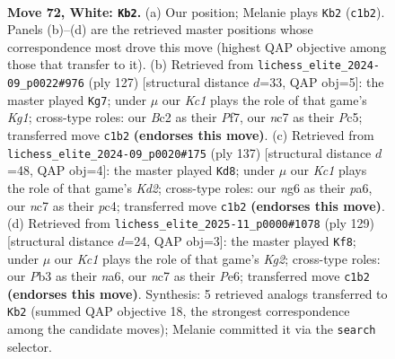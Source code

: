 \documentclass[11pt]{article}
\begin{document}
\clearpage

\begin{figure}[p]\centering
\begin{subfigure}{0.46\textwidth}\centering
\resizebox{\linewidth}{!}{%
\newchessgame
\chessboard[
  setfen={8/2n3k1/1b1N2n1/p7/P2pP3/1P5p/2B1P3/2K5 w - - 10 72},
  showmover=false,
  pgfstyle=straightmove, color=movearrow, markmove={c1-b2}
]}
\caption{}
\end{subfigure}\hfill
\begin{subfigure}{0.46\textwidth}\centering
\resizebox{\linewidth}{!}{%
\newchessgame
\chessboard[
  setfen={6k1/4bp2/3p4/2pP1Pp1/2P5/2NK4/1B6/8 b - - 2 64},
  showmover=false,
  pgfstyle=straightmove, color=movearrow, markmove={g8-g7}
]}
\caption{}
\end{subfigure}
\\[4pt]
\begin{subfigure}{0.46\textwidth}\centering
\resizebox{\linewidth}{!}{%
\newchessgame
\chessboard[
  setfen={8/3k4/PK4p1/7p/2PBb2P/5p2/5P2/8 b - - 8 69},
  showmover=false,
  pgfstyle=straightmove, color=movearrow, markmove={d7-d8}
]}
\caption{}
\end{subfigure}\hfill
\begin{subfigure}{0.46\textwidth}\centering
\resizebox{\linewidth}{!}{%
\newchessgame
\chessboard[
  setfen={8/6k1/N3p2p/bn1bN1p1/4p3/6PP/1B3P2/5K2 b - - 0 65},
  showmover=false,
  pgfstyle=straightmove, color=movearrow, markmove={g7-f8}
]}
\caption{}
\end{subfigure}
\caption{\textbf{Move 72, White: \texttt{Kb2}.} (a) Our position; Melanie plays \texttt{Kb2} (\texttt{c1b2}). Panels (b)--(d) are the retrieved master positions whose correspondence most drove this move (highest QAP objective among those that transfer to it). (b) Retrieved from \texttt{lichess\_elite\_2024-09\_p0022\#976} (ply 127) [structural distance $d$=33, QAP obj=5]: the master played \texttt{Kg7}; under $\mu$ our \emph{Kc1} plays the role of that game's \emph{Kg1}; cross-type roles: our \emph{B}c2 as their \emph{P}f7, our \emph{n}c7 as their \emph{P}c5; transferred move \texttt{c1b2} \textbf{(endorses this move)}. (c) Retrieved from \texttt{lichess\_elite\_2024-09\_p0020\#175} (ply 137) [structural distance $d$=48, QAP obj=4]: the master played \texttt{Kd8}; under $\mu$ our \emph{Kc1} plays the role of that game's \emph{Kd2}; cross-type roles: our \emph{n}g6 as their \emph{p}a6, our \emph{n}c7 as their \emph{p}c4; transferred move \texttt{c1b2} \textbf{(endorses this move)}. (d) Retrieved from \texttt{lichess\_elite\_2025-11\_p0000\#1078} (ply 129) [structural distance $d$=24, QAP obj=3]: the master played \texttt{Kf8}; under $\mu$ our \emph{Kc1} plays the role of that game's \emph{Kg2}; cross-type roles: our \emph{P}b3 as their \emph{n}a6, our \emph{n}c7 as their \emph{P}e6; transferred move \texttt{c1b2} \textbf{(endorses this move)}. Synthesis: 5 retrieved analogs transferred to \texttt{Kb2} (summed QAP objective 18, the strongest correspondence among the candidate moves); Melanie committed it via the \texttt{search} selector.}
\label{fig:thought-m142}
\end{figure}
\end{document}

